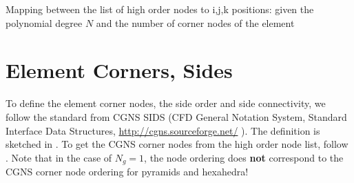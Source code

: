 \documentclass[a4paper,headsepline]{scrreprt}
\newcommand\rf[1]{\prettyref{#1}}
\newcommand\Ngeo{N_g}
\begin{document}
\begin{algorithm}[h!]
\small
 \caption{Mapping between the list of high order nodes to i,j,k positions: given the polynomial degree $N$ and the number of corner nodes of the element  \label{alg:ijkmapping}}
 \DontPrintSemicolon
\end{algorithm}

\section{Element Corners, Sides}
\label{sec:CGNS}
To define the element corner nodes, the side order and side connectivity, we follow the standard from CGNS SIDS (CFD General Notation System, Standard Interface Data Structures, \url{http://cgns.sourceforge.net/} ). The definition is sketched in \rf{fig:CGNS}. To get the CGNS corner nodes from the high order node list, follow \rf{alg:cornermapping}. Note that in the case of $\Ngeo=1$, the node ordering does \textbf{not} correspond to the CGNS corner node ordering for pyramids and hexahedra! 
\end{document}
